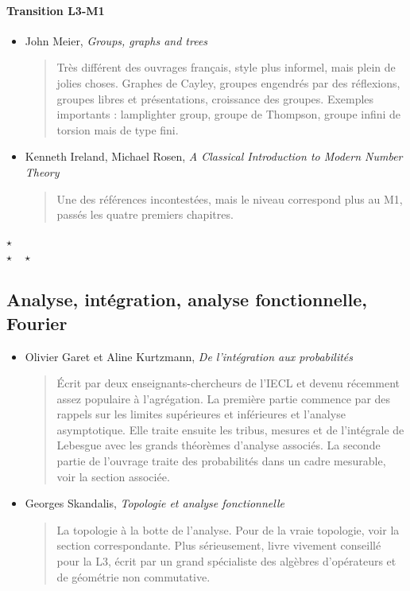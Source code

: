 \documentclass{article}
\def\separateur{\begin{center}
$\star$\\
$\star\quad\star$
\end{center}}
\begin{document}
\paragraph{Transition L3-M1}
\begin{itemize}
\item John Meier, \emph{Groups, graphs and trees}
\begin{quote}
Très différent des ouvrages français, style plus informel, mais plein de jolies choses. Graphes de Cayley, groupes engendrés par des réflexions, groupes libres et présentations, croissance des groupes. Exemples importants : \og lamplighter group\fg{}, groupe de Thompson, groupe infini de torsion mais de type fini. 
\end{quote}

\item Kenneth Ireland, Michael Rosen, \emph{A Classical Introduction to Modern Number Theory}
\begin{quote}
Une des références incontestées, mais le niveau correspond plus au M1, passés les quatre premiers chapitres.
\end{quote}
\end{itemize}

\separateur
\subsection{Analyse, intégration, analyse fonctionnelle, Fourier}


\vspace{1em}

\begin{mdframed}
\begin{itemize}
\item Olivier Garet et Aline Kurtzmann, \emph{De l'intégration aux probabilités}
\begin{quote}
Écrit par deux enseignants-chercheurs de l'IECL et devenu récemment assez populaire à l'agrégation. La première partie commence par des rappels sur les limites supérieures et inférieures et l'analyse asymptotique. Elle traite ensuite les tribus, mesures et de l'intégrale de Lebesgue avec les grands théorèmes d'analyse associés. La seconde partie de l'ouvrage traite des probabilités dans un cadre mesurable, voir la section associée.
\end{quote}
\item Georges Skandalis, \emph{Topologie et analyse fonctionnelle}
\begin{quote}
La topologie à la botte de l'analyse. Pour de la vraie topologie, voir la section correspondante. Plus sérieusement, livre vivement conseillé pour la L3, écrit par un grand spécialiste des algèbres d'opérateurs et de géométrie non commutative.
\end{quote}
\end{itemize}
\end{mdframed}
\end{document}
